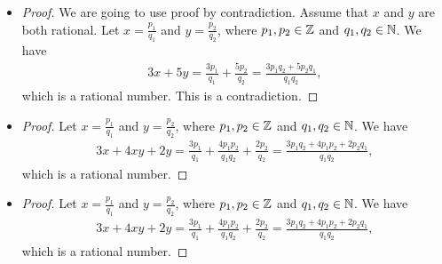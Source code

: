 \documentclass[8pt]{article}
\begin{document}
\begin{Answer}[number=2.2.10]
  \begin{itemize}
    \item
      \begin{proof}
        We are going to use proof by contradiction. Assume that $x$ and $y$ are
        both rational. Let $x=\frac{p_1}{q_1}$ and $y=\frac{p_2}{q_2}$, where
        $p_1,p_2\in \mathbb{Z}$ and $q_1,q_2\in \mathbb{N}$. We have
        \begin{align*}
          3x + 5y = \frac{3p_1}{q_1} + \frac{5p_2}{q_2} =
          \frac{3p_1q_2+5p_2q_1}{q_1q_2},
        \end{align*}
        which is a rational number. This is a contradiction.
      \end{proof}
    \item
      \begin{proof}
        Let $x=\frac{p_1}{q_1}$ and $y=\frac{p_2}{q_2}$, where
        $p_1,p_2\in \mathbb{Z}$ and $q_1,q_2\in \mathbb{N}$. We have
        \begin{align*}
          3x + 4xy + 2y = \frac{3p_1}{q_1} + \frac{4p_1p_2}{q_1q_2} +
          \frac{2p_2}{q_2} = \frac{3p_1q_2+4p_1p_2+2p_2q_1}{q_1q_2},
        \end{align*}
        which is a rational number.
      \end{proof}
    \item
      \begin{proof}
        Let $x=\frac{p_1}{q_1}$ and $y=\frac{p_2}{q_2}$, where
        $p_1,p_2\in \mathbb{Z}$ and $q_1,q_2\in \mathbb{N}$. We have
        \begin{align*}
          3x + 4xy + 2y = \frac{3p_1}{q_1} + \frac{4p_1p_2}{q_1q_2} +
          \frac{2p_2}{q_2} = \frac{3p_1q_2+4p_1p_2+2p_2q_1}{q_1q_2},
        \end{align*}
        which is a rational number.
      \end{proof}
  \end{itemize}
\end{Answer}
\end{document}
